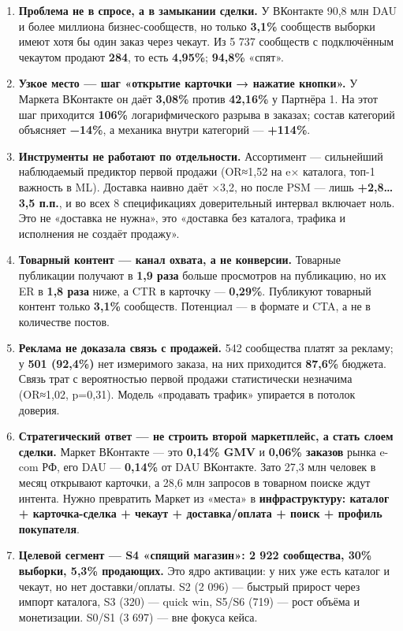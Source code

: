 \documentclass[10pt,a4paper]{article}
\begin{document}
\begin{enumerate}[leftmargin=1.35em,itemsep=2pt,topsep=3pt,parsep=0pt]
\item \textbf{Проблема не в спросе, а в замыкании сделки.} У ВКонтакте 90,8 млн DAU и более миллиона бизнес-сообществ, но только \textbf{3,1\%} сообществ выборки имеют хотя бы один заказ через чекаут. Из 5 737 сообществ с подключённым чекаутом продают \textbf{284}, то есть \textbf{4,95\%}; \textbf{94,8\%} «спят».
\item \textbf{Узкое место — шаг «открытие карточки → нажатие кнопки».} У Маркета ВКонтакте он даёт \textbf{3,08\%} против \textbf{42,16\%} у Партнёра 1. На этот шаг приходится \textbf{106\%} логарифмического разрыва в заказах; состав категорий объясняет \textbf{−14\%}, а механика внутри категорий — \textbf{+114\%}.
\item \textbf{Инструменты не работают по отдельности.} Ассортимент — сильнейший наблюдаемый предиктор первой продажи (OR≈1,52 на e× каталога, топ-1 важность в ML). Доставка наивно даёт ×3,2, но после PSM — лишь \textbf{+2,8…3,5 п.п.}, и во всех 8 спецификациях доверительный интервал включает ноль. Это не «доставка не нужна», это «доставка без каталога, трафика и исполнения не создаёт продажу».
\item \textbf{Товарный контент — канал охвата, а не конверсии.} Товарные публикации получают в \textbf{1,9 раза} больше просмотров на публикацию, но их ER в \textbf{1,8 раза} ниже, а CTR в карточку — \textbf{0,29\%}. Публикуют товарный контент только \textbf{3,1\%} сообществ. Потенциал — в формате и CTA, а не в количестве постов.
\item \textbf{Реклама не доказала связь с продажей.} 542 сообщества платят за рекламу; у \textbf{501 (92,4\%)} нет измеримого заказа, на них приходится \textbf{87,6\%} бюджета. Связь трат с вероятностью первой продажи статистически незначима (OR≈1,02, p=0,31). Модель «продавать трафик» упирается в потолок доверия.
\item \textbf{Стратегический ответ — не строить второй маркетплейс, а стать слоем сделки.} Маркет ВКонтакте — это \textbf{0,14\% GMV} и \textbf{0,06\% заказов} рынка e-com РФ, его DAU — \textbf{0,14\%} от DAU ВКонтакте. Зато 27,3 млн человек в месяц открывают карточки, а 28,6 млн запросов в товарном поиске ждут интента. Нужно превратить Маркет из «места» в \textbf{инфраструктуру: каталог + карточка-сделка + чекаут + доставка/оплата + поиск + профиль покупателя}.
\item \textbf{Целевой сегмент — S4 «спящий магазин»: 2 922 сообщества, 30\% выборки, 5,3\% продающих.} Это ядро активации: у них уже есть каталог и чекаут, но нет доставки/оплаты. S2 (2 096) — быстрый прирост через импорт каталога, S3 (320) — quick win, S5/S6 (719) — рост объёма и монетизации. S0/S1 (3 697) — вне фокуса кейса.

\end{enumerate}
\end{document}
